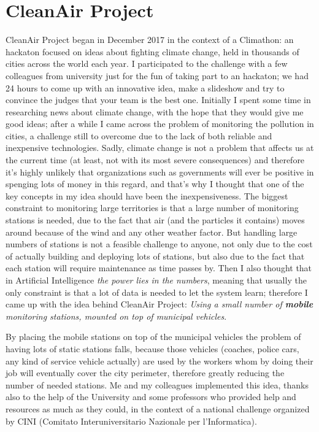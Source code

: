 \documentclass[11pt,a4paper,titlepage]{book}
\begin{document}
\section{CleanAir Project}
CleanAir Project began in December 2017 in the context of a Climathon: an hackaton focused on ideas about fighting climate change, held in thousands of cities across the world each year.
\newline
\newline
I participated to the challenge with a few colleagues from university just for the fun of taking part to an hackaton; we had 24 hours to come up with an innovative idea, make a slideshow and try to convince the judges that your team is the best one.
\newline
\newline
Initially I spent some time in researching news about climate change, with the hope that they would give me good ideas; after a while I came across the problem of monitoring the pollution in cities, a challenge still to overcome due to the lack of both reliable and inexpensive technologies.
\newline
Sadly, climate change is not a problem that affects us at the current time (at least, not with its most severe consequences) and therefore it's highly unlikely that organizations such as governments will ever be positive in spenging lots of money in this regard, and that's why I thought that one of the key concepts in my idea should have been the inexpensiveness.
\newline
\newline
The biggest constraint to monitoring large territories is that a large number of monitoring stations is needed, due to the fact that air (and the particles it contains) moves around because of the wind and any other weather factor. But handling large numbers of stations is not a feasible challenge to anyone, not only due to the cost of actually building and deploying lots of stations, but also due to the fact that each station will require maintenance as time passes by.
\newline
\newline
Then I also thought that in Artificial Intelligence \textit{the power lies in the numbers}, meaning that usually the only constraint is that a lot of data is needed to let the system learn; therefore I came up with the idea behind CleanAir Project: \textit{Using a small number of \textbf{mobile} monitoring stations, mounted on top of municipal vehicles}.

By placing the mobile stations on top of the municipal vehicles the problem of having lots of static stations falls, because those vehicles (coaches, police cars, any kind of service vehicle actually) are used by the workers whom by doing their job will eventually cover the city perimeter, therefore greatly reducing the number of needed stations.
\newline
\newline
Me and my colleagues implemented this idea, thanks also to the help of the University and some professors who provided help and resources as much as they could, in the context of a national challenge organized by CINI (Comitato Interuniversitario Nazionale per l'Informatica).
\end{document}
